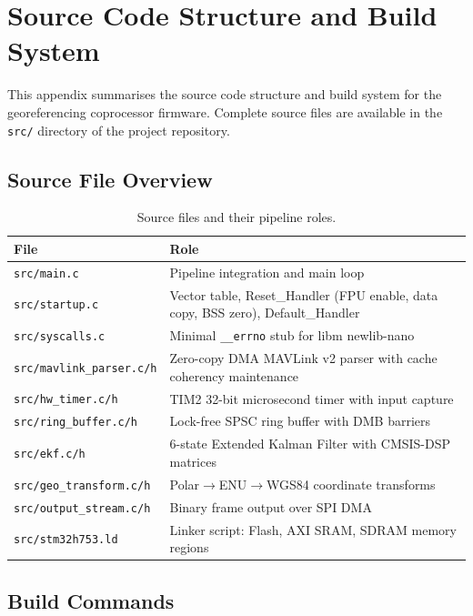 \chapter{Source Code Structure and Build System}
\label{app:A}

This appendix summarises the source code structure and build system for the georeferencing coprocessor firmware. Complete source files are available in the \texttt{src/} directory of the project repository.

\section{Source File Overview}

\begin{table}[htbp]
\centering
\caption{Source files and their pipeline roles.}
\label{tab:A:files}
\begin{tabularx}{\textwidth}{@{}p{4.5cm}Y@{}}
\toprule
\textbf{File} & \textbf{Role} \\
\midrule
\texttt{src/main.c} & Pipeline integration and main loop \\
\texttt{src/startup.c} & Vector table, Reset\_Handler (FPU enable, data copy, BSS zero), Default\_Handler \\
\texttt{src/syscalls.c} & Minimal \texttt{\_\_errno} stub for libm newlib-nano \\
\texttt{src/mavlink\_parser.c/h} & Zero-copy DMA MAVLink v2 parser with cache coherency maintenance \\
\texttt{src/hw\_timer.c/h} & TIM2 32-bit microsecond timer with input capture \\
\texttt{src/ring\_buffer.c/h} & Lock-free SPSC ring buffer with DMB barriers \\
\texttt{src/ekf.c/h} & 6-state Extended Kalman Filter with CMSIS-DSP matrices \\
\texttt{src/geo\_transform.c/h} & Polar$\rightarrow$ENU$\rightarrow$WGS84 coordinate transforms \\
\texttt{src/output\_stream.c/h} & Binary frame output over SPI DMA \\
\texttt{src/stm32h753.ld} & Linker script: Flash, AXI SRAM, SDRAM memory regions \\
\bottomrule
\end{tabularx}
\end{table}

\section{Build Commands}

